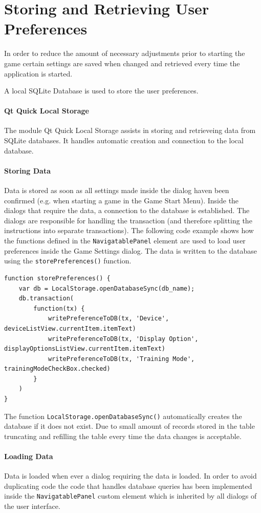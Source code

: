 \section{Storing and Retrieving User Preferences}
\label{sec:Preferences}
In order to reduce the amount of necessary adjustments prior to starting the game certain settings are saved when changed and retrieved every time the application is started. 

A local SQLite Database is used to store the user preferences.

\paragraph{Qt Quick Local Storage}
The module Qt Quick Local Storage assists in storing and retrieveing data from SQLite databases. 
It handles automatic creation and connection to the local database.

\paragraph{Storing Data}
Data is stored as soon as all settings made inside the dialog haven been confirmed (e.g. when starting a game in the Game Start Menu). Inside the dialogs that require the data, a connection to the database is established. The dialogs are responsible for handling the transaction (and therefore splitting the instructions into separate transactions). The following code example shows how the functions defined in the {\tt NavigatablePanel} element are used to load user preferences inside the Game Settings dialog. The data is written to the database using the {\tt storePreferences()} function.

\begin{lstlisting}
function storePreferences() {
    var db = LocalStorage.openDatabaseSync(db_name);
    db.transaction(
        function(tx) {
            writePreferenceToDB(tx, 'Device', deviceListView.currentItem.itemText)
            writePreferenceToDB(tx, 'Display Option', displayOptionsListView.currentItem.itemText)
            writePreferenceToDB(tx, 'Training Mode', trainingModeCheckBox.checked)
        }
    )
}
\end{lstlisting}

The function {\tt LocalStorage.openDatabaseSync()} automatically creates the database if it does not exist. Due to small amount of records stored in the table truncating and refilling the table every time the data changes is acceptable.
\paragraph{Loading Data}
Data is loaded when ever a dialog requiring the data is loaded.
In order to avoid duplicating code the code that handles database queries has been implemented inside the {\tt NavigatablePanel} custom element which is inherited by all dialogs of the user interface.

